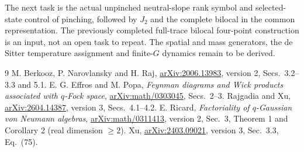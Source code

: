 \documentclass[11pt]{article}
\begin{document}
The next task is the actual unpinched neutral-slope rank symbol and
selected-state control of pinching, followed by $J_2$ and the complete
bilocal in the common representation. The previously completed
full-trace bilocal four-point construction is an input, not an open
task to repeat. The spatial and mass generators, the de Sitter
temperature assignment and finite-$G$ dynamics remain to be derived.

\begin{thebibliography}{9}\small
{} M. Berkooz, P. Narovlansky and H. Raj,
\href{https://arxiv.org/abs/2006.13983}{arXiv:2006.13983},
version 2, Secs.~3.2--3.3 and 5.1.
 E. G. Effros and M. Popa,
\emph{Feynman diagrams and Wick products associated with $q$-Fock space},
\href{https://arxiv.org/abs/math/0303045}{arXiv:math/0303045}, Secs.~2--3.
 Rajgadia and Xu,
\href{https://arxiv.org/abs/2604.14387}{arXiv:2604.14387},
version 3, Secs.~4.1--4.2.
 E. Ricard, \emph{Factoriality of $q$-Gaussian von Neumann algebras},
\href{https://arxiv.org/abs/math/0311413}{arXiv:math/0311413},
version 2, Sec.~3, Theorem 1 and Corollary 2 (real dimension $\ge2$).
 Xu,
\href{https://arxiv.org/abs/2403.09021}{arXiv:2403.09021},
version 3, Sec.~3.3, Eq.~(75).
\end{thebibliography}
\end{document}
